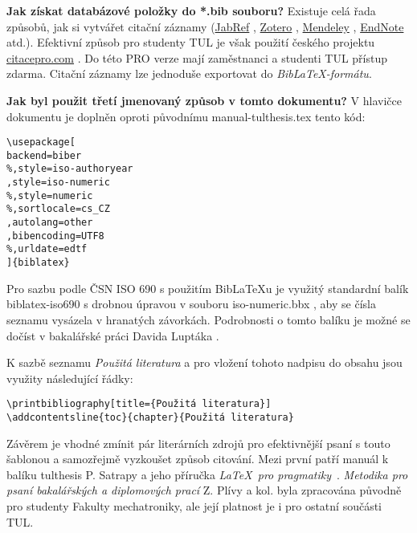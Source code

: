 \documentclass[FM,DP,EN]{tulthesis}
\newcommand{\argument}[1]{{\ttfamily\color{\tulcolor}#1}}
\newenvironment{myquote}{\begin{list}{}{\setlength\leftmargin\parindent}\item[]}{\end{list}}
\newenvironment{listing}{\begin{myquote}\color{\tulcolor}}{\end{myquote}}
\begin{document}
\textbf{Jak získat databázové položky do \argument{*.bib} souboru?} Existuje celá řada způsobů, jak si vytvářet citační záznamy (\href{www.jabref.org}{JabRef} \cite{webJabRef}, \href{https://www.zotero.org}{Zotero} \cite{webZotero}, \href{https://www.mendeley.com}{Mendeley} \cite{webMendeley}, \href{https://endnote.com}{EndNote} \cite{webEndNote} atd.). Efektivní způsob pro studenty TUL je však použití českého projektu \href{citacepro.com}{citacepro.com} \cite{webCitaceCOM}. Do této PRO verze mají zaměstnanci a studenti TUL přístup zdarma. Citační záznamy lze jednoduše exportovat do \textit{Bib\LaTeX-formátu}. 

\textbf{Jak byl použit třetí jmenovaný způsob v tomto dokumentu?}
V hlavičce dokumentu je doplněn oproti původnímu \argument{manual-tulthesis.tex} tento kód:
\begin{listing}
\begin{verbatim}
\usepackage[ 
backend=biber
%,style=iso-authoryear
,style=iso-numeric
%,style=numeric
%,sortlocale=cs_CZ
,autolang=other
,bibencoding=UTF8
%,urldate=edtf
]{biblatex}

\end{verbatim}
\end{listing}
Pro sazbu podle ČSN ISO 690 s použitím Bib\LaTeX{}u je využitý standardní balík \argument{biblatex-iso690} s drobnou úpravou v souboru \argument{iso-numeric.bbx} , aby se čísla seznamu vysázela v hranatých závorkách. Podrobnosti o tomto balíku je možné se dočíst v bakalářské práci Davida Luptáka \cite{Lupták2016thesis}.

K sazbě seznamu \textit{Použitá literatura} a pro vložení tohoto nadpisu do obsahu jsou využity následující řádky:
\begin{listing}
\begin{verbatim}
\printbibliography[title={Použitá literatura}] 
\addcontentsline{toc}{chapter}{Použitá literatura}     
\end{verbatim}
\end{listing}

Závěrem je vhodné zmínit pár literárních zdrojů pro efektivnější psaní s touto šablonou a samozřejmě vyzkoušet způsob citování. Mezi první patří manuál k balíku \argument{tulthesis} P. Satrapy \cite{Satrapa2019tulthesis} a jeho příručka \textit{\LaTeX\  pro pragmatiky}~\cite{Satrapa2011LatexPragmatiky}. \textit{Metodika pro psaní bakalářských a diplomových prací} Z. Plívy a kol. \cite{Pliva2019DOKcz} byla zpracována původně pro studenty Fakulty mechatroniky, ale její platnost je i pro ostatní součásti TUL. 

\nocite{*}

\printbibliography[title={Použitá literatura}] %

\newpage
\renewcommand{\indexname}{Přehled příkazů, prostředí a voleb}
\printindex
\end{document}

